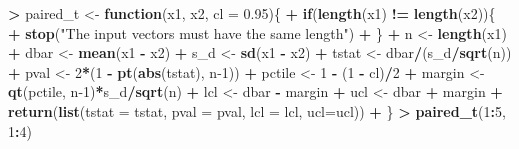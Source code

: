 \documentclass[
]{krantz}
\makeatletter
\newenvironment{Shaded}{\begin{snugshade}}{\end{snugshade}}
\newcommand{\ControlFlowTok}[1]{\textcolor[rgb]{0.27,0.27,0.27}{\textbf{#1}}}
\newcommand{\DataTypeTok}[1]{\textcolor[rgb]{0.27,0.27,0.27}{#1}}
\newcommand{\DecValTok}[1]{\textcolor[rgb]{0.06,0.06,0.06}{#1}}
\newcommand{\FloatTok}[1]{\textcolor[rgb]{0.06,0.06,0.06}{#1}}
\newcommand{\KeywordTok}[1]{\textcolor[rgb]{0.27,0.27,0.27}{\textbf{#1}}}
\newcommand{\NormalTok}[1]{#1}
\newcommand{\OperatorTok}[1]{\textcolor[rgb]{0.43,0.43,0.43}{\textbf{#1}}}
\newcommand{\StringTok}[1]{\textcolor[rgb]{0.5,0.5,0.5}{#1}}
\newenvironment{kframe}{%
\medskip{}
\setlength{\fboxsep}{.8em}
 \def\at@end@of@kframe{}%
 \ifinner\ifhmode%
  \def\at@end@of@kframe{\end{minipage}}%
  \begin{minipage}{\columnwidth}%
 \fi\fi%
 \def\FrameCommand##1{\hskip\@totalleftmargin \hskip-\fboxsep
 \colorbox{shadecolor}{##1}\hskip-\fboxsep
     \hskip-\linewidth \hskip-\@totalleftmargin \hskip\columnwidth}%
 \MakeFramed {\advance\hsize-\width
   \@totalleftmargin\z@ \linewidth\hsize
   \@setminipage}}%
 {\par\unskip\endMakeFramed%
 \at@end@of@kframe}
\renewenvironment{Shaded}{\begin{kframe}}{\end{kframe}}
\makeatother
\begin{document}
\begin{Shaded}
\begin{Highlighting}[]
\OperatorTok{\textgreater{}}\StringTok{ }\NormalTok{paired\_t \textless{}{-}}\StringTok{ }\ControlFlowTok{function}\NormalTok{(x1, x2, }\DataTypeTok{cl =} \FloatTok{0.95}\NormalTok{)\{}
\OperatorTok{+}\StringTok{     }\ControlFlowTok{if}\NormalTok{(}\KeywordTok{length}\NormalTok{(x1) }\OperatorTok{!=}\StringTok{ }\KeywordTok{length}\NormalTok{(x2))\{}
\OperatorTok{+}\StringTok{         }\KeywordTok{stop}\NormalTok{(}\StringTok{"The input vectors  must have the same length"}\NormalTok{)}
\OperatorTok{+}\StringTok{     }\NormalTok{\}}
\OperatorTok{+}\StringTok{     }\NormalTok{n \textless{}{-}}\StringTok{ }\KeywordTok{length}\NormalTok{(x1)}
\OperatorTok{+}\StringTok{     }\NormalTok{dbar \textless{}{-}}\StringTok{ }\KeywordTok{mean}\NormalTok{(x1 }\OperatorTok{{-}}\StringTok{ }\NormalTok{x2)}
\OperatorTok{+}\StringTok{     }\NormalTok{s\_d \textless{}{-}}\StringTok{ }\KeywordTok{sd}\NormalTok{(x1 }\OperatorTok{{-}}\StringTok{ }\NormalTok{x2)}
\OperatorTok{+}\StringTok{     }\NormalTok{tstat \textless{}{-}}\StringTok{ }\NormalTok{dbar}\OperatorTok{/}\NormalTok{(s\_d}\OperatorTok{/}\KeywordTok{sqrt}\NormalTok{(n))}
\OperatorTok{+}\StringTok{     }\NormalTok{pval \textless{}{-}}\StringTok{ }\DecValTok{2}\OperatorTok{*}\NormalTok{(}\DecValTok{1} \OperatorTok{{-}}\StringTok{ }\KeywordTok{pt}\NormalTok{(}\KeywordTok{abs}\NormalTok{(tstat), n}\DecValTok{{-}1}\NormalTok{))}
\OperatorTok{+}\StringTok{     }\NormalTok{pctile \textless{}{-}}\StringTok{ }\DecValTok{1} \OperatorTok{{-}}\StringTok{ }\NormalTok{(}\DecValTok{1} \OperatorTok{{-}}\StringTok{ }\NormalTok{cl)}\OperatorTok{/}\DecValTok{2}
\OperatorTok{+}\StringTok{     }\NormalTok{margin \textless{}{-}}\StringTok{ }\KeywordTok{qt}\NormalTok{(pctile, n}\DecValTok{{-}1}\NormalTok{)}\OperatorTok{*}\NormalTok{s\_d}\OperatorTok{/}\KeywordTok{sqrt}\NormalTok{(n)}
\OperatorTok{+}\StringTok{     }\NormalTok{lcl \textless{}{-}}\StringTok{ }\NormalTok{dbar }\OperatorTok{{-}}\StringTok{ }\NormalTok{margin}
\OperatorTok{+}\StringTok{     }\NormalTok{ucl \textless{}{-}}\StringTok{ }\NormalTok{dbar }\OperatorTok{+}\StringTok{ }\NormalTok{margin}
\OperatorTok{+}\StringTok{     }\KeywordTok{return}\NormalTok{(}\KeywordTok{list}\NormalTok{(}\DataTypeTok{tstat =}\NormalTok{ tstat, }\DataTypeTok{pval =}\NormalTok{ pval, }\DataTypeTok{lcl =}\NormalTok{ lcl, }\DataTypeTok{ucl=}\NormalTok{ucl))}
\OperatorTok{+}\StringTok{ }\NormalTok{\}}
\OperatorTok{\textgreater{}}\StringTok{ }\KeywordTok{paired\_t}\NormalTok{(}\DecValTok{1}\OperatorTok{:}\DecValTok{5}\NormalTok{, }\DecValTok{1}\OperatorTok{:}\DecValTok{4}\NormalTok{)}
\end{Highlighting}
\end{Shaded}
\end{document}

